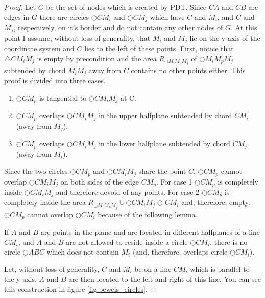 \begin{proof}


Let $G $ be the set of nodes which is created by PDT. 
Since $CA $ and $CB $ are edges in $G $ there are circles $\bigcirc{CM_i} $ and $\bigcirc{CM_j} $ which have $C $ and $M_i $, and $C $ and $M_j $, respectively, on it's border and do not contain any other nodes of $G $. 
At this point I assume, without loss of generality, that $M_i $ and $M_j $ lie on the y-axis of the coordinate system and $C $ lies to the left of these points.
First, notice that $\triangle{CM_iM_j} $ is empty by precondition and the area $R_{\bigcirc{M_iM_pM_j}} $ of $\bigcirc{M_iM_pM_j} $ subtended by chord $M_iM_j $ away from $C $ contains no other points either.
This proof is divided into three cases.
\begin{enumerate}
\item $\bigcirc{CM_p} $ is tangential to $\bigcirc{CM_iM_j} $ at C.
\item $\bigcirc{CM_p} $ overlaps $\bigcirc{CM_iM_j} $ in the upper halfplane subtended by chord $CM_i $ (away from $M_j $).
\item $\bigcirc{CM_p} $ overlaps $\bigcirc{CM_iM_j} $ in the lower halfplane subtended by chord $CM_j $ (away from $M_i $).
\end{enumerate}
Since the two circles $\bigcirc{CM_p} $ and $\bigcirc{CM_iM_j} $ share the point $C $, $\bigcirc{CM_p} $ cannot overlap $\bigcirc{CM_iM_j} $ on both sides of the edge $CM_p $.
For case 1 $\bigcirc{CM_p} $ is completely inside $\bigcirc{CM_iM_j} $ and therefore devoid of any points.
For case 2 $\bigcirc{CM_p} $ is completely inside the area $R_{\bigcirc{M_iM_pM_j}} \cup \bigcirc{CM_iM_j} \bigcirc{CM_i} $ and, therefore, empty.
$\bigcirc{CM_p} $ cannot overlap $\bigcirc{CM_i} $ because of the following lemma.
\begin{lemma}
\label{circles}
If $A $ and $B $ are points in the plane and are located in different halfplanes of a line $CM_i $, and $A $ and $B $ are not allowed to reside inside a circle $\bigcirc{CM_i} $, there is no circle $\bigcirc{ABC} $ which does not contain $M_i $ (and, therefore, overlaps circle $\bigcirc{CM_i} $).
\end{lemma}
 Let, without loss of generality, $C $ and $M_i $ be on a line $CM_i $ which is parallel to the y-axis.
$A $ and $B $ are then located to the left and right of this line.
You can see this construction in figure \ref{fig:beweis_circles}.


\end{proof}
